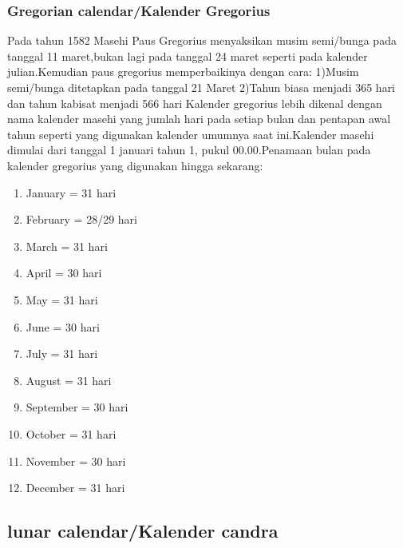     \subsubsection{Gregorian calendar/Kalender Gregorius}
      Pada tahun 1582 Masehi Paus Gregorius menyaksikan musim semi/bunga pada tanggal 11 maret,bukan lagi pada tanggal 24 maret seperti pada kalender julian.Kemudian paus gregorius memperbaikinya dengan cara:
      1)Musim semi/bunga ditetapkan pada tanggal 21 Maret
      2)Tahun biasa menjadi 365 hari dan tahun kabisat menjadi 566 hari
      Kalender gregorius lebih dikenal dengan nama kalender masehi yang jumlah hari pada setiap bulan dan pentapan awal tahun seperti yang digunakan kalender umumnya saat ini.Kalender masehi dimulai dari tanggal 1 januari
      tahun 1, pukul 00.00.Penamaan bulan pada kalender gregorius yang digunakan hingga sekarang:
      \begin{enumerate}
        \item  January   = 31 hari
        \item  February  = 28/29 hari
        \item  March     = 31 hari
        \item  April     = 30 hari
        \item  May       = 31 hari
        \item  June      = 30 hari
        \item  July      = 31 hari
        \item  August    = 31 hari
        \item  September = 30 hari
        \item  October  = 31 hari
        \item  November = 30 hari
        \item  December = 31 hari
      \end{enumerate}

 \subsection{lunar calendar/Kalender candra}

